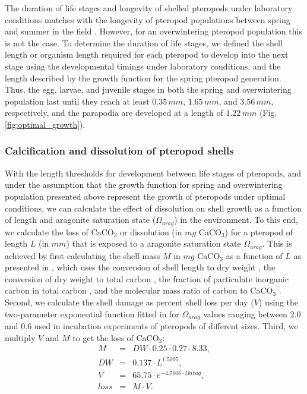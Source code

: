 The duration of life stages and longevity of shelled pteropods under laboratory conditions \citep{Thabet2015Lifestages} matches with the longevity of pteropod populations between spring and summer in the field \citep{Wang2017Lifecycle}. However, for an overwintering pteropod population this is not the case. To determine the duration of life stages, we defined the shell length or organism length required for each pteropod to develop into the next stage using the developmental timings under laboratory conditions, and the length described by the growth function for the spring pteropod generation. Thus, the egg, larvae, and juvenile stages in both the spring and overwintering population last until they reach at least $0.35\,mm$, $1.65\, mm$, and $3.56\, mm$, respectively, and the parapodia are developed at a length of $1.22\,mm$ (Fig. \ref{fig:optimal_growth}).


\subsubsection{Calcification and dissolution of pteropod shells}

With the length thresholds for development between life stages of pteropods, and under the assumption that the growth function for spring and overwintering population presented above represent the growth of pteropods under optimal conditions, we can calculate the effect of dissolution on shell growth as a function of length and aragonite saturation state ($\Omega_{arag}$) in the environment. To this end, we calculate the loss of CaCO$_3$ or dissolution (in $mg$ CaCO$_3$) for a pteropod of length $L$ (in $mm$) that is exposed to a aragonite saturation state $\Omega_{arag}$. This is achieved by first calculating the shell mass $M$ in $mg$ CaCO$_3$ as a function of $L$ as presented in \cite{Bednarsek2014CalcificationDissolution}, which uses the conversion of shell length to dry weight \citep[DW; ][]{Bednarsek2012DryWeight}, the conversion of dry weight to total carbon \citep[0.25; ][]{Larson1986Carbon}, the fraction of particulate inorganic carbon in total carbon \citep[0.27; ][]{Bednarsek2012DryWeight}, and the molecular mass ratio of carbon to CaCO$_3$ \citep[8.33; ][]{Bednarsek2014CalcificationDissolution}. Second, we calculate the shell damage as percent shell loss per day ($V$) using the two-parameter exponential function fitted in \cite{Bednarsek2014CalcificationDissolution} for $\Omega_{arag}$ values ranging between $2.0$ and $0.6$ used in incubation experiments of pteropods of different sizes. Third, we multiply $V$ and $M$ to get the loss of CaCO$_3$:
\begin{eqnarray}
M & = & DW \cdot 0.25 \cdot 0.27 \cdot 8.33, \\
DW & = & 0.137 \cdot L^{1.5005}, \\
V & = & 65.75 \cdot e^{-4.7606 \cdot \Omega{arag}}, \\
loss & = & M \cdot V.
\end{eqnarray}


